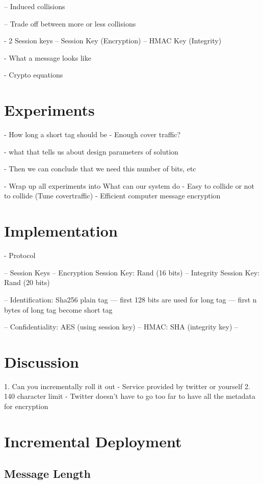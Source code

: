 \documentclass{acm_proc_article-sp}
\begin{document}
-- Induced collisions

-- Trade off between more or less collisions

- 2 Session keys
-- Session Key (Encryption)
-- HMAC Key (Integrity)

- What a message looks like

- Crypto equations

\section{Experiments}

- How long a short tag should be
- Enough cover traffic?

- what that tells us about design parameters of solution

- Then we can conclude that we need this number of bits, etc

- Wrap up all experiments into What can our system do
	- Easy to collide or not to collide (Tune covertraffic)
	- Efficient computer message encryption



\section{Implementation}

- Protocol

-- Session Keys
-- Encryption Session Key: Rand (16 bits)
-- Integrity Session Key: Rand (20 bits)

-- Identification: Sha256 plain tag
--- first 128 bits are used for long tag
--- first n bytes of long tag become short tag

-- Confidentiality: AES (using session key)
-- HMAC: SHA (integrity key)
-- 

\section{Discussion}
1. Can you incrementally roll it out
	- Service provided by twitter or yourself
2. 140 character limit
	- Twitter doesn't have to go too far to have all the metadata for encryption

\section{Incremental Deployment}

\subsection{Message Length}
\end{document}
